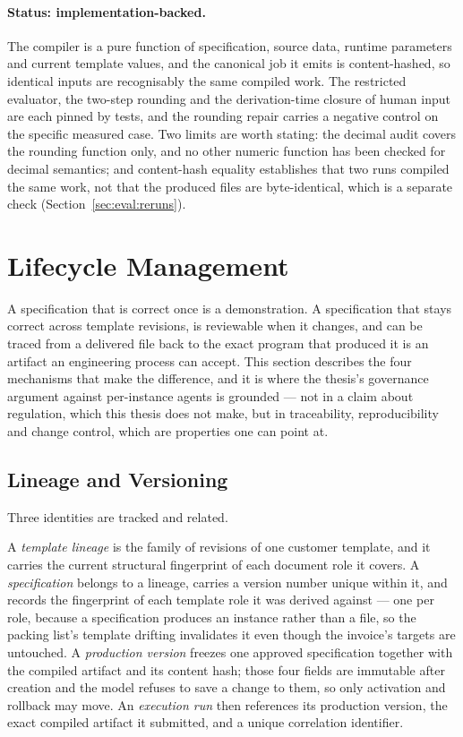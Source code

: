 \paragraph{Status: implementation-backed.}
The compiler is a pure function of specification, source data, runtime parameters and current
template values, and the canonical job it emits is content-hashed, so identical inputs are
recognisably the same compiled work. The restricted evaluator, the two-step rounding and the
derivation-time closure of human input are each pinned by tests, and the rounding repair
carries a negative control on the specific measured case. Two limits are worth stating: the
decimal audit covers the rounding function only, and no other numeric function has been checked
for decimal semantics; and content-hash equality establishes that two runs compiled the same
work, not that the produced files are byte-identical, which is a separate check
(Section~\ref{sec:eval:reruns}).
\section{Lifecycle Management}
\label{sec:design:lifecycle}

A specification that is correct once is a demonstration. A specification that stays correct
across template revisions, is reviewable when it changes, and can be traced from a delivered
file back to the exact program that produced it is an artifact an engineering process can
accept. This section describes the four mechanisms that make the difference, and it is where
the thesis's governance argument against per-instance agents is grounded --- not in a claim
about regulation, which this thesis does not make, but in traceability, reproducibility and
change control, which are properties one can point at.

\subsection{Lineage and Versioning}
\label{sec:design:lineage}

Three identities are tracked and related.

A \emph{template lineage} is the family of revisions of one customer template, and it carries
the current structural fingerprint of each document role it covers. A \emph{specification}
belongs to a lineage, carries a version number unique within it, and records the fingerprint of
each template role it was derived against --- one per role, because a specification produces an
instance rather than a file, so the packing list's template drifting invalidates it even though
the invoice's targets are untouched. A \emph{production version} freezes one approved
specification together with the compiled artifact and its content hash; those four fields are
immutable after creation and the model refuses to save a change to them, so only activation and
rollback may move. An \emph{execution run} then references its production version, the exact
compiled artifact it submitted, and a unique correlation identifier.

